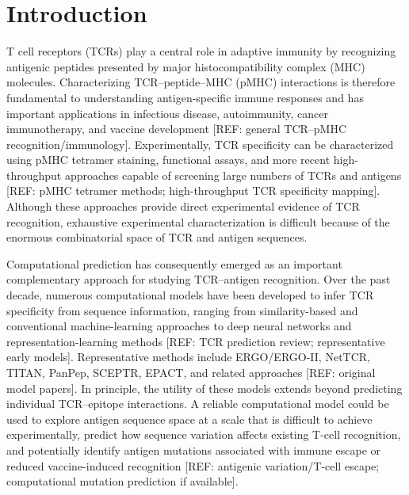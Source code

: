 



\section{Introduction}
T cell receptors (TCRs) play a central role in adaptive immunity by recognizing antigenic peptides presented by major histocompatibility complex (MHC) molecules. Characterizing TCR–peptide–MHC (pMHC) interactions is therefore fundamental to understanding antigen-specific immune responses and has important applications in infectious disease, autoimmunity, cancer immunotherapy, and vaccine development [REF: general TCR–pMHC recognition/immunology]. Experimentally, TCR specificity can be characterized using pMHC tetramer staining, functional assays, and more recent high-throughput approaches capable of screening large numbers of TCRs and antigens [REF: pMHC tetramer methods; high-throughput TCR specificity mapping]. Although these approaches provide direct experimental evidence of TCR recognition, exhaustive experimental characterization is difficult because of the enormous combinatorial space of TCR and antigen sequences.

Computational prediction has consequently emerged as an important complementary approach for studying TCR–antigen recognition. Over the past decade, numerous computational models have been developed to infer TCR specificity from sequence information, ranging from similarity-based and conventional machine-learning approaches to deep neural networks and representation-learning methods [REF: TCR prediction review; representative early models]. Representative methods include ERGO/ERGO-II, NetTCR, TITAN, PanPep, SCEPTR, EPACT, and related approaches [REF: original model papers]. In principle, the utility of these models extends beyond predicting individual TCR–epitope interactions. A reliable computational model could be used to explore antigen sequence space at a scale that is difficult to achieve experimentally, predict how sequence variation affects existing T-cell recognition, and potentially identify antigen mutations associated with immune escape or reduced vaccine-induced recognition [REF: antigenic variation/T-cell escape; computational mutation prediction if available].

